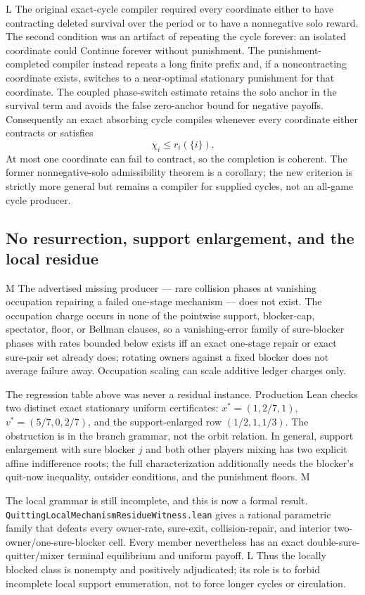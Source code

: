 \documentclass[11pt]{article}
\newcommand{\LTag}{\textsf{L}}
\newcommand{\MTag}{\textsf{M}}
\newcommand{\Prod}{\LTag}
\newcommand{\Audit}{\MTag}
\newcommand{\Status}[1]{#1}
\begin{document}
\Status{\Prod} The original exact-cycle compiler required every coordinate
either to have contracting deleted survival over the period or to have a
nonnegative solo reward.  The second condition was an artifact of repeating
the cycle forever: an isolated coordinate could Continue forever without
punishment.  The punishment-completed compiler instead repeats a long finite
prefix and, if a noncontracting coordinate exists, switches to a near-optimal
stationary punishment for that coordinate.  The coupled phase-switch estimate
retains the solo anchor in the survival term and avoids the false zero-anchor
bound for negative payoffs.  Consequently an exact absorbing cycle compiles
whenever every coordinate either contracts or satisfies
\[
  \chi_i\leq r_i(\{i\}).
\]
At most one coordinate can fail to contract, so the completion is coherent.
The former nonnegative-solo admissibility theorem is a corollary; the new
criterion is strictly more general but remains a compiler for supplied cycles,
not an all-game cycle producer.

\subsection{No resurrection, support enlargement, and the local residue}

\Status{\Audit} The advertised missing producer --- rare collision phases at
vanishing occupation repairing a failed one-stage mechanism --- does not
exist.  The occupation charge occurs in none of the pointwise support,
blocker-cap, spectator, floor, or Bellman clauses, so a vanishing-error
family of sure-blocker phases with rates bounded below exists iff an exact
one-stage repair or exact sure-pair set already does; rotating owners
against a fixed blocker does not average failure away.  Occupation scaling
can scale additive ledger charges only.

The regression table above was never a residual instance.  Production Lean
checks two distinct exact stationary uniform certificates:
\(x^*=(1,2/7,1)\), \(v^*=(5/7,0,2/7)\), and the support-enlarged row
\((1/2,1,1/3)\).  The obstruction is in the branch grammar, not the orbit
relation.  In general, support enlargement with sure blocker \(j\) and both
other players mixing has two explicit affine indifference roots; the full
characterization additionally needs the blocker's quit-now inequality,
outsider conditions, and the punishment floors.  \Status{\Audit}

The local grammar is still incomplete, and this is now a formal result.
\texttt{QuittingLocalMechanism\-ResidueWitness.lean} gives a rational parametric
family that defeats every owner-rate, sure-exit, collision-repair, and interior
two-owner/one-sure-blocker cell.  Every member nevertheless has an exact
double-sure-quitter/mixer terminal equilibrium and uniform payoff.
\Status{\Prod} Thus the locally blocked class is nonempty and positively
adjudicated; its role is to forbid incomplete local support enumeration, not to
force longer cycles or circulation.
\end{document}
